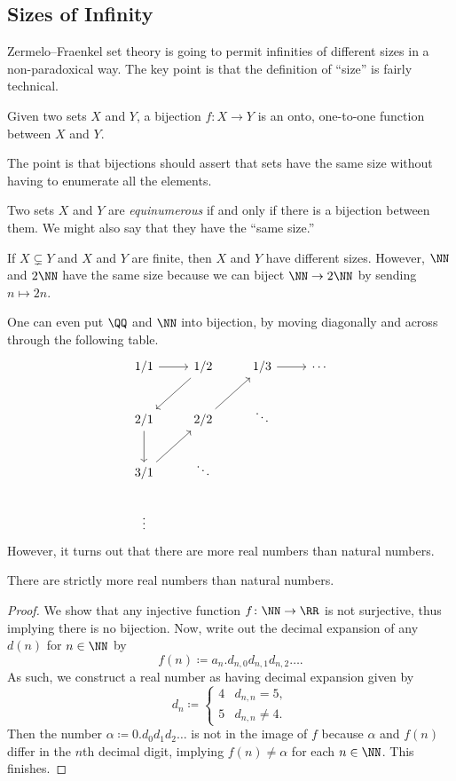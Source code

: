 \subsection{Sizes of Infinity}
Zermelo--Fraenkel set theory is going to permit infinities of different sizes in a non-paradoxical way. The key point is that the definition of ``size'' is fairly technical.
\begin{definition}[Bijection]
	Given two sets $X$ and $Y$, a bijection $f\colon X\to Y$ is an onto, one-to-one function between $X$ and $Y$.
\end{definition}
The point is that bijections should assert that sets have the same size without having to enumerate all the elements.
\begin{definition}[Equinumerous]
	Two sets $X$ and $Y$ are \textit{equinumerous} if and only if there is a bijection between them. We might also say that they have the ``same size.''
\end{definition}
\begin{remark}
	If $X\subsetneq Y$ and $X$ and $Y$ are finite, then $X$ and $Y$ have different sizes. However, $\NN$ and $2\NN$ have the same size because we can biject $\NN\to2\NN$ by sending $n\mapsto2n$.
\end{remark}
One can even put $\QQ$ and $\NN$ into bijection, by moving diagonally and across through the following table.
\[\begin{tikzcd}
	{1/1} & {1/2} & {1/3} & \cdots \\
	{2/1} & {2/2} & \ddots \\
	{3/1} & \ddots \\
	\vdots
	\arrow[from=1-1, to=1-2]
	\arrow[from=1-2, to=2-1]
	\arrow[from=2-1, to=3-1]
	\arrow[from=3-1, to=2-2]
	\arrow[from=2-2, to=1-3]
	\arrow[from=1-3, to=1-4]
\end{tikzcd}\]
However, it turns out that there are more real numbers than natural numbers.
\begin{proposition}
	There are strictly more real numbers than natural numbers.
\end{proposition}
\begin{proof}
	We show that any injective function $f\colon\NN\to\RR$ is not surjective, thus implying there is no bijection. Now, write out the decimal expansion of any $d(n)$ for $n\in\NN$ by
	\[f(n)\coloneqq a_{n}.d_{n,0}d_{n,1}d_{n,2}\ldots.\]
	As such, we construct a real number as having decimal expansion given by
	\[d_n\coloneqq\begin{cases}
		4 & d_{n,n}=5, \\
		5 & d_{n,n}\ne 4.
	\end{cases}\]
	Then the number $\alpha\coloneqq0.d_0d_1d_2\ldots$ is not in the image of $f$ because $\alpha$ and $f(n)$ differ in the $n$th decimal digit, implying $f(n)\ne\alpha$ for each $n\in\NN$. This finishes.
\end{proof}
